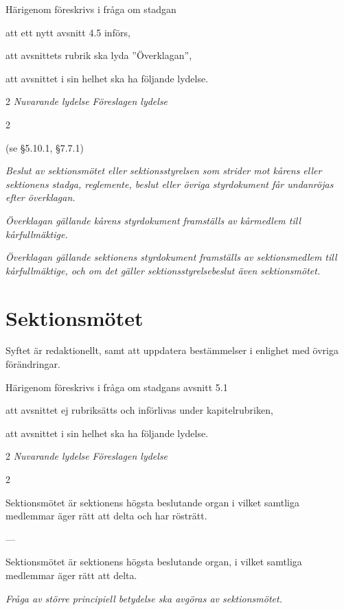 \documentclass{article}
\newenvironment{lydelse}
    {\begin{paracol}{2}%
        \emph{Nuvarande lydelse}%
        \switchcolumn%
        \emph{Föreslagen lydelse}%
    \end{paracol}%
    \begin{enumerate}[label=\thesubsection.\arabic*]%
    \begin{paracol}{2}%
    }{\end{paracol}\end{enumerate}}
\begin{document}
Härigenom föreskrivs i fråga om stadgan
\begin{dels}
  \item att ett nytt avsnitt 4.5 införs,
  \item att avsnittets rubrik ska lyda ''Överklagan'',
  \item att avsnittet i sin helhet ska ha följande lydelse.
\end{dels}

\begin{lydelse}
  \item[] (se \S 5.10.1, \S 7.7.1)
  
  \switchcolumn
  \item \emph{Beslut av sektionsmötet eller sektionsstyrelsen som strider mot kårens eller sektionens stadga, reglemente, beslut eller övriga styrdokument får undanröjas efter överklagan.}
  \item \emph{Överklagan gällande kårens styrdokument framställs av kårmedlem till kårfullmäktige.}
  \item \emph{Överklagan gällande sektionens styrdokument framställs av sektionsmedlem till kårfullmäktige, och om det gäller sektionsstyrelsebeslut även sektionsmötet.}
\end{lydelse}

\section{Sektionsmötet}
Syftet är redaktionellt, samt att uppdatera bestämmelser i enlighet med övriga förändringar.

Härigenom föreskrivs i fråga om stadgans avsnitt 5.1
\begin{dels}
    \item att avsnittet ej rubriksätts och införlivas under kapitelrubriken,
    \item att avsnittet i sin helhet ska ha följande lydelse.
\end{dels}

\begin{lydelse}
  \setcounter{subsection}{1}
    \item Sektionsmötet är sektionens högsta beslutande organ i vilket samtliga medlemmar äger rätt att delta och har rösträtt.

    \item[] ---
  \switchcolumn
  \setcounter{subsection}{0}
    \item Sektionsmötet är sektionens högsta beslutande organ, i vilket samtliga medlemmar äger rätt att delta.

    \item \emph{Fråga av större principiell betydelse ska avgöras av sektionsmötet.}

\end{lydelse}
\end{document}
